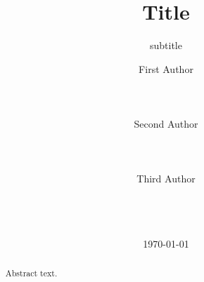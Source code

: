 \documentclass{styles/acm_proc_article-sp}
\title{Title}
\subtitle{subtitle}
\author{
  \alignauthor
  First Author\\
    \affaddr{First Address}\\
    \affaddr{First Address}\\
    \affaddr{First Address}\\
    \email{first@email}
  \alignauthor
  Second Author\\
    \affaddr{Second Address}\\
    \affaddr{Second Address}\\
    \affaddr{Second Address}\\
    \email{second@email}
  \alignauthor
  Third Author\\
    \affaddr{Third Address}\\
    \affaddr{Third Address}\\
    \affaddr{Third Address}\\
    \email{third@email}
}
\date{\today}
\begin{document}
\maketitle
\begin{abstract}
  Abstract text.
\end{abstract}








 
\end{document}
